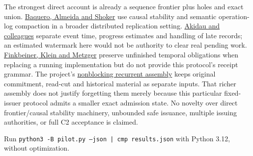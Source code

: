 \documentclass[11pt]{article}
\begin{document}
The strongest direct account is already a sequence frontier plus holes and exact union. \href{https://arxiv.org/abs/1710.04469}{Baquero, Almeida and Shoker} use causal stability and semantic operation-log compaction in a broader distributed replication setting. \href{https://research.google.com/pubs/archive/43864.pdf}{Akidau and colleagues} separate event time, progress estimates and handling of late records; an estimated watermark here would not be authority to clear real pending work. \href{https://arxiv.org/abs/2107.01136}{Finkbeiner, Klein and Metzger} preserve unfinished temporal obligations when replacing a running implementation but do not provide this protocol's receipt grammar. The project's \href{https://github.com/eternal-november/eos-research-programmes/blob/e1348964f73704212d2d8b48d5982a5ed600a2ff/projects/contextual-composition/foundations/native-whole-scope-feedback/Nonblocking_Recurrent_Assembly_Reading_Route.tex}{nonblocking recurrent assembly} keeps original commitment, read-cut and historical material as separate inputs. That richer assembly does not justify forgetting them merely because this particular fixed-issuer protocol admits a smaller exact admission state. No novelty over direct frontier/causal stability machinery, unbounded safe issuance, multiple issuing authorities, or full C2 acceptance is claimed.

Run \texttt{python3 -B pilot.py --json | cmp results.json} with Python 3.12, without optimization.
\end{document}
